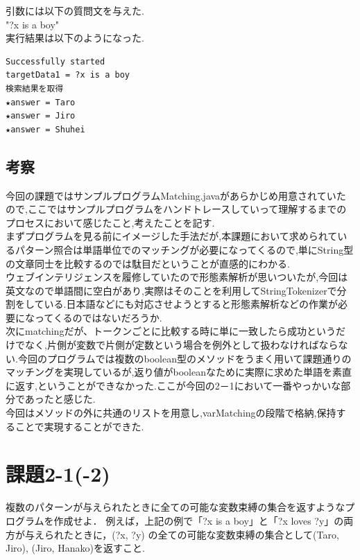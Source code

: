 \documentclass[12pt]{jarticle}
\begin{document}
引数には以下の質問文を与えた.\\
"?x is a boy"\\

実行結果は以下のようになった.
\begin{lstlisting}[caption=実行結果]
Successfully started
targetData1 = ?x is a boy
検索結果を取得
★answer = Taro
★answer = Jiro
★answer = Shuhei
\end{lstlisting}


\subsection{考察}
今回の課題ではサンプルプログラムMatching.javaがあらかじめ用意されていたので,ここではサンプルプログラムをハンドトレースしていって理解するまでのプロセスにおいて感じたこと,考えたことを記す.\\
まずプログラムを見る前にイメージした手法だが,本課題において求められているパターン照合は単語単位でのマッチングが必要になってくるので,単にString型の文章同士を比較するのでは駄目だということが直感的にわかる.\\
ウェブインテリジェンスを履修していたので形態素解析が思いついたが,今回は英文なので単語間に空白があり,実際はそのことを利用してStringTokenizerで分割をしている.日本語などにも対応させようとすると形態素解析などの作業が必要になってくるのではないだろうか.\\
次にmatchingだが、トークンごとに比較する時に単に一致したら成功というだけでなく,片側が変数で片側が定数という場合を例外として扱わなければならない.今回のプログラムでは複数のboolean型のメソッドをうまく用いて課題通りのマッチングを実現しているが,返り値がbooleanなために実際に求めた単語を素直に返す,ということができなかった.ここが今回の2－1において一番やっかいな部分であったと感じた.\\
今回はメソッドの外に共通のリストを用意し,varMatchingの段階で格納,保持することで実現することができた.




\section{課題2-1(-2)}
\begin{screen}
複数のパターンが与えられたときに全ての可能な変数束縛の集合を返すようなプログラムを作成せよ．
例えば，上記の例で「?x is a boy」と「?x loves ?y」の両方が与えられたときに，(?x, ?y) の全ての可能な変数束縛の集合として{(Taro, Jiro), (Jiro, Hanako)}を返すこと.
\end{screen}
\end{document}
